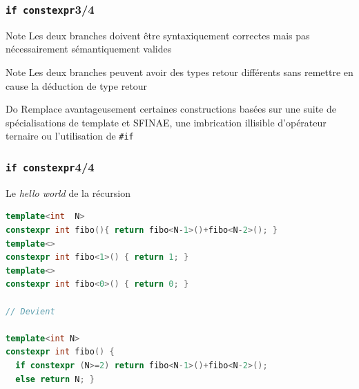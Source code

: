 \documentclass[C++.tex]{subfiles}
\begin{document}
\begin{frame}[fragile]
	\frametitle{\lstinline|if constexpr|\titlehfill{}3/4}
	\begin{block}{Note}
		Les deux branches doivent être syntaxiquement correctes mais pas nécessairement sémantiquement valides
	\end{block}

	\begin{block}{Note}
		Les deux branches peuvent avoir des types retour différents sans remettre en cause la déduction de type retour
	\end{block}

	\begin{exampleblock}{Do}
		Remplace avantageusement certaines constructions basées sur une suite de spécialisations de template et SFINAE, une imbrication illisible d'opérateur ternaire ou l'utilisation de \lstinline|#if|

	\end{exampleblock}
\end{frame}

\begin{frame}[fragile]
	\frametitle{\lstinline|if constexpr|\titlehfill{}4/4}
	\begin{block}{Le \textit{hello world} de la récursion}
		\begin{lstlisting}[language=C++]
template<int  N>
constexpr int fibo(){ return fibo<N-1>()+fibo<N-2>(); }
template<>
constexpr int fibo<1>() { return 1; }
template<>
constexpr int fibo<0>() { return 0; }

// Devient

template<int N>
constexpr int fibo() {
  if constexpr (N>=2) return fibo<N-1>()+fibo<N-2>();
  else return N; }\end{lstlisting}
	\end{block}
\end{frame}
\end{document}
